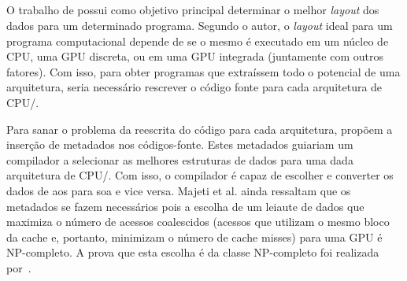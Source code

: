 

\subsection{}

O trabalho de  possui como objetivo principal determinar o melhor \textit{layout} dos dados para um determinado programa. Segundo o autor, o \textit{layout} ideal para um programa computacional depende de se o mesmo é executado em um núcleo de CPU, uma GPU discreta, ou em uma GPU integrada (juntamente com outros fatores). Com isso, para obter programas que extraíssem todo o potencial de uma arquitetura, seria necessário rescrever o código fonte para cada arquitetura de CPU\@/\@GPU.

Para sanar o problema da reescrita do código para cada arquitetura,  propõem a inserção de metadados nos códigos-fonte. Estes metadados guiariam um compilador a selecionar as melhores estruturas de dados para uma dada arquitetura de CPU\@/\@GPU. Com isso, o compilador é capaz de escolher e converter os dados de \ac{aos} para \ac{soa} e vice versa.
Majeti et al. ainda ressaltam que os metadados se fazem necessários pois a escolha de um leiaute de dados que maximiza o número de acessos coalescidos (acessos que utilizam o mesmo bloco da cache e, portanto, minimizam o número de cache misses) para uma GPU é NP-completo. A prova que esta escolha é da classe NP-completo foi realizada por~.


